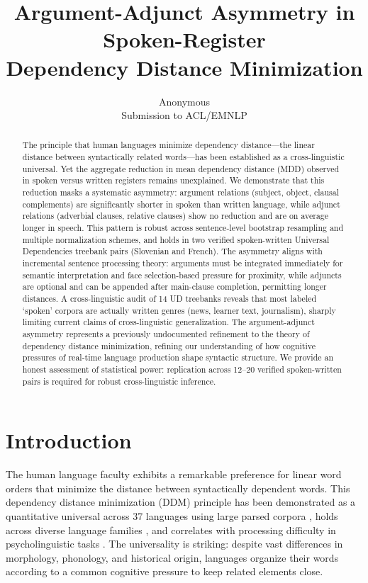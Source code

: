 \documentclass[11pt,letterpaper]{article}
\title{\textbf{Argument-Adjunct Asymmetry in Spoken-Register\\Dependency Distance Minimization}}
\author{%
  Anonymous\\[0.5em]
  \small Submission to ACL/EMNLP
}
\date{}
\begin{document}
\maketitle

\begin{abstract}
The principle that human languages minimize dependency distance---the linear distance between syntactically related words---has been established as a cross-linguistic universal. Yet the aggregate reduction in mean dependency distance (MDD) observed in spoken versus written registers remains unexplained. We demonstrate that this reduction masks a systematic asymmetry: argument relations (subject, object, clausal complements) are significantly shorter in spoken than written language, while adjunct relations (adverbial clauses, relative clauses) show no reduction and are on average longer in speech. This pattern is robust across sentence-level bootstrap resampling and multiple normalization schemes, and holds in two verified spoken-written Universal Dependencies treebank pairs (Slovenian and French). The asymmetry aligns with incremental sentence processing theory: arguments must be integrated immediately for semantic interpretation and face selection-based pressure for proximity, while adjuncts are optional and can be appended after main-clause completion, permitting longer distances. A cross-linguistic audit of 14 UD treebanks reveals that most labeled `spoken' corpora are actually written genres (news, learner text, journalism), sharply limiting current claims of cross-linguistic generalization. The argument-adjunct asymmetry represents a previously undocumented refinement to the theory of dependency distance minimization, refining our understanding of how cognitive pressures of real-time language production shape syntactic structure. We provide an honest assessment of statistical power: replication across 12--20 verified spoken-written pairs is required for robust cross-linguistic inference.
\end{abstract}

\section{Introduction}

The human language faculty exhibits a remarkable preference for linear word orders that minimize the distance between syntactically dependent words. This dependency distance minimization (DDM) principle has been demonstrated as a quantitative universal across 37 languages using large parsed corpora \citep{Futrell2015}, holds across diverse language families \citep{FerreriCancho2022}, and correlates with processing difficulty in psycholinguistic tasks \citep{Liu2008}. The universality is striking: despite vast differences in morphology, phonology, and historical origin, languages organize their words according to a common cognitive pressure to keep related elements close.
\end{document}
